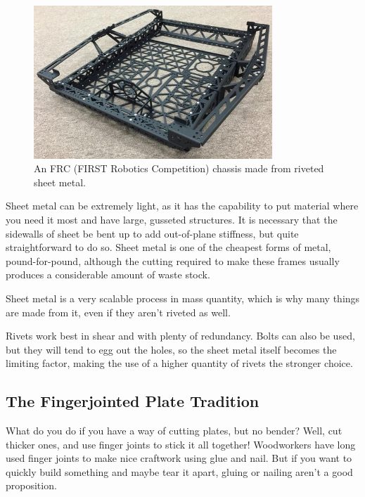\documentclass[10pt,letterpaper]{book}
\begin{document}
	\begin{figure}[H]
		\includegraphics[width=0.8\textwidth]{imgs/tradition_sheetmetal_148.png}
		\caption{An FRC (FIRST Robotics Competition) chassis made from riveted sheet metal.}
	\end{figure}
	
	Sheet metal can be extremely light, as it has the capability to put material where you need it most and have large, gusseted structures. It is necessary that the sidewalls of sheet be bent up to add out-of-plane stiffness, but quite straightforward to do so. Sheet metal is one of the cheapest forms of metal, pound-for-pound, although the cutting required to make these frames usually produces a considerable amount of waste stock. 
	
	Sheet metal is a very scalable process in mass quantity, which is why many things are made from it, even if they aren't riveted as well.
	
	Rivets work best in shear and with plenty of redundancy. Bolts can also be used, but they will tend to egg out the holes, so the sheet metal itself becomes the limiting factor, making the use of a higher quantity of rivets the stronger choice.
	
	\subsection{The Fingerjointed Plate Tradition}
	What do you do if you have a way of cutting plates, but no bender? Well, cut thicker ones, and use finger joints to stick it all together! Woodworkers have long used finger joints to make nice craftwork using glue and nail. But if you want to quickly build something and maybe tear it apart, gluing or nailing aren't a good proposition.
	
\end{document}
